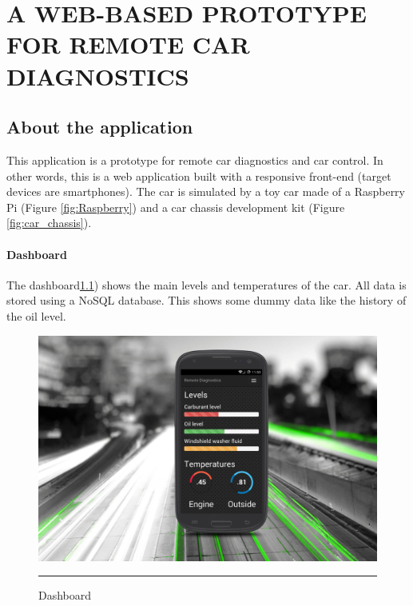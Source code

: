 
\chapter{A WEB-BASED PROTOTYPE FOR REMOTE CAR DIAGNOSTICS} %

\label{Chapter4} %


\section{About the application}
This application is a prototype for remote car diagnostics and car control. In other words, this is a web application built with a responsive front-end (target devices are smartphones). The car is simulated by a toy car made of a Raspberry Pi (Figure \ref{fig:Raspberry}) and a car chassis development kit  (Figure \ref{fig:car_chassis}). 

\subsubsection{Dashboard}
The dashboard\ref{fig:dashboard}) shows the main levels and temperatures of the car. All data is stored using a NoSQL database. This shows some dummy data like the history of the oil level.

\newpage
\begin{figure}[h!]
  \centering
    \includegraphics[width=1\textwidth]{./Pictures/dashboard.jpg}
  \rule{1\textwidth}{1pt}
 \caption{Dashboard}
  \label{fig:dashboard}
\end{figure}
